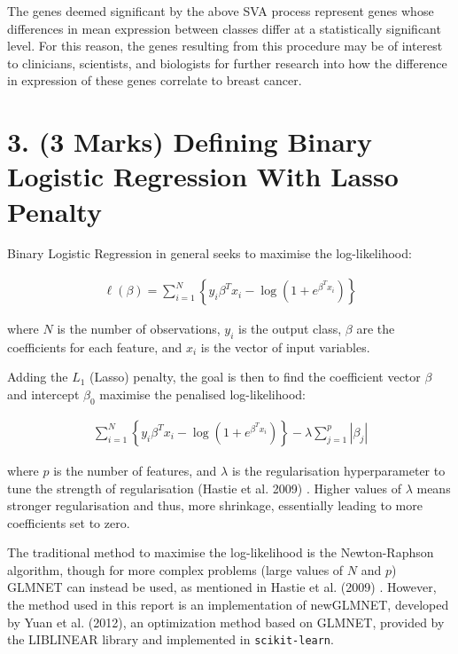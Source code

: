 \documentclass[twocolumn]{article}
\begin{document}
The genes deemed significant by the above SVA process represent genes whose differences in mean expression between classes differ at a statistically significant level. For this reason, the genes resulting from this procedure may be of interest to clinicians, scientists, and biologists for further research into how the difference in expression of these genes correlate to breast cancer.

\section{3. (3 Marks) Defining Binary Logistic Regression With Lasso Penalty}

Binary Logistic Regression in general seeks to maximise the log-likelihood:

\begin{align*}
    \ell(\beta) = \sum^{N}_{i=1}\left\{ y_i \beta^T x_i - \log\left(1 + e^{\beta^T x_i}\right) \right\}
\end{align*}

where $N$ is the number of observations, $y_i$ is the output class, $\beta$ are the coefficients for each feature, and $x_i$ is the vector of input variables.

Adding the $L_1$ (Lasso) penalty, the goal is then to find the coefficient vector $\beta$ and intercept $\beta_0$ maximise the penalised log-likelihood:

\begin{align*}
    \sum^{N}_{i=1}\left\{ y_i \beta^T x_i - \log\left(1 + e^{\beta^T x_i}\right) \right\} - \lambda \sum^{p}_{j=1}|\beta_j|
\end{align*}

where $p$ is the number of features, and $\lambda$ is the regularisation hyperparameter to tune the strength of regularisation (Hastie et al. 2009) \cite{HastieTrevor2009EoSL}. Higher values of $\lambda$ means stronger regularisation and thus, more shrinkage, essentially leading to more coefficients set to zero.

The traditional method to maximise the log-likelihood is the Newton-Raphson algorithm, though for more complex problems (large values of $N$ and $p$) GLMNET can instead be used, as mentioned in Hastie et al. (2009) \cite{HastieTrevor2009EoSL}. However, the method used in this report is an implementation of newGLMNET, developed by Yuan et al. (2012)\cite{JMLR:v13:yuan12a}, an optimization method based on GLMNET, provided by the LIBLINEAR library and implemented in \texttt{scikit-learn}.
\end{document}
